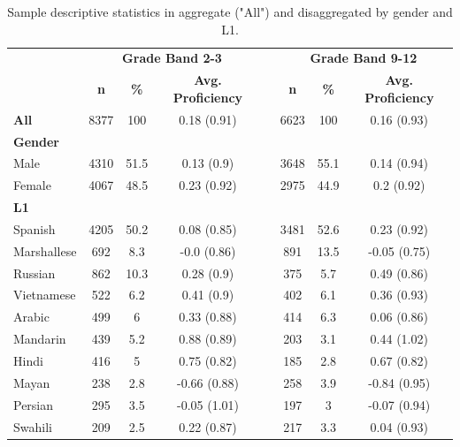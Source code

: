 \documentclass [PhD] {uclathes}
\begin{document}
\begin{table}[htbp]
\centering
\begin{tabular}{lccccccc}
\toprule
    & \multicolumn{3}{c}{\textbf{Grade Band 2-3}} & \multicolumn{1}{c}{ } & \multicolumn{3}{c}{\textbf{Grade Band 9-12}} \\
    \cline{2-4}
    \cline{6-8}
     & \textbf{n} & \textbf{\%} & \textbf{Avg. Proficiency} & & \textbf{n} & \textbf{\%} & \textbf{Avg. Proficiency} \\
    \midrule
    \textbf{All} & 8377 & 100 & 0.18 (0.91) & & 6623 & 100 & 0.16 (0.93) \\
    \textbf{Gender} &  &  &  & &  &  &  \\
    \hspace{3mm} Male & 4310 & 51.5 & 0.13 (0.9) & & 3648 & 55.1 & 0.14 (0.94) \\
    \hspace{3mm} Female & 4067 & 48.5 & 0.23 (0.92) & & 2975 & 44.9 & 0.2 (0.92) \\
    \textbf{L1} &  &  &  & &  &  &  \\
    \hspace{3mm} Spanish & 4205 & 50.2 & 0.08 (0.85) & & 3481 & 52.6 & 0.23 (0.92) \\
    \hspace{3mm} Marshallese & 692 & 8.3 & -0.0 (0.86) & & 891 & 13.5 & -0.05 (0.75) \\
    \hspace{3mm} Russian & 862 & 10.3 & 0.28 (0.9) & & 375 & 5.7 & 0.49 (0.86) \\
    \hspace{3mm} Vietnamese & 522 & 6.2 & 0.41 (0.9) & & 402 & 6.1 & 0.36 (0.93) \\
    \hspace{3mm} Arabic & 499 & 6 & 0.33 (0.88) & & 414 & 6.3 & 0.06 (0.86) \\
    \hspace{3mm} Mandarin & 439 & 5.2 & 0.88 (0.89) & & 203 & 3.1 & 0.44 (1.02) \\
    \hspace{3mm} Hindi & 416 & 5 & 0.75 (0.82) & & 185 & 2.8 & 0.67 (0.82) \\
    \hspace{3mm} Mayan & 238 & 2.8 & -0.66 (0.88) & & 258 & 3.9 & -0.84 (0.95) \\
    \hspace{3mm} Persian & 295 & 3.5 & -0.05 (1.01) & & 197 & 3 & -0.07 (0.94) \\
    \hspace{3mm} Swahili & 209 & 2.5 & 0.22 (0.87) & & 217 & 3.3 & 0.04 (0.93) \\
    \bottomrule
    \end{tabular}
\caption{\label{smp_dscr}
Sample descriptive statistics in aggregate ("All") and disaggregated by gender and L1.}
\end{table}
\end{document}
